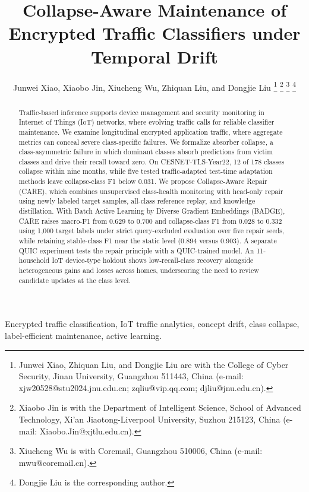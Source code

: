 \documentclass[journal]{IEEEtran}
\begin{document}
\title{Collapse-Aware Maintenance of Encrypted Traffic Classifiers under Temporal Drift}

\author{Junwei Xiao, Xiaobo Jin, Xiucheng Wu, Zhiquan Liu, and Dongjie Liu%
\thanks{Junwei Xiao, Zhiquan Liu, and Dongjie Liu are with the College of Cyber Security, Jinan University, Guangzhou 511443, China (e-mail: xjw20528@stu2024.jnu.edu.cn; zqliu@vip.qq.com; djliu@jnu.edu.cn).}%
\thanks{Xiaobo Jin is with the Department of Intelligent Science, School of Advanced Technology, Xi'an Jiaotong-Liverpool University, Suzhou 215123, China (e-mail: Xiaobo.Jin@xjtlu.edu.cn).}%
\thanks{Xiucheng Wu is with Coremail, Guangzhou 510006, China (e-mail: mwu@coremail.cn).}%
\thanks{Dongjie Liu is the corresponding author.}}

\maketitle

\begin{abstract}
Traffic-based inference supports device management and security monitoring in Internet of Things (IoT) networks, where evolving traffic calls for reliable classifier maintenance. We examine longitudinal encrypted application traffic, where aggregate metrics can conceal severe class-specific failures. We formalize absorber collapse, a class-asymmetric failure in which dominant classes absorb predictions from victim classes and drive their recall toward zero. On CESNET-TLS-Year22, 12 of 178 classes collapse within nine months, while five tested traffic-adapted test-time adaptation methods leave collapse-class F1 below 0.031. We propose Collapse-Aware Repair (CARE), which combines unsupervised class-health monitoring with head-only repair using newly labeled target samples, all-class reference replay, and knowledge distillation. With Batch Active Learning by Diverse Gradient Embeddings (BADGE), CARE raises macro-F1 from 0.629 to 0.700 and collapse-class F1 from 0.028 to 0.332 using 1{,}000 target labels under strict query-excluded evaluation over five repair seeds, while retaining stable-class F1 near the static level (0.894 versus 0.903). A separate QUIC experiment tests the repair principle with a QUIC-trained model. An 11-household IoT device-type holdout shows low-recall-class recovery alongside heterogeneous gains and losses across homes, underscoring the need to review candidate updates at the class level.
\end{abstract}

\begin{IEEEkeywords}
Encrypted traffic classification, IoT traffic analytics, concept drift, class collapse, label-efficient maintenance, active learning.
\end{IEEEkeywords}
\end{document}
